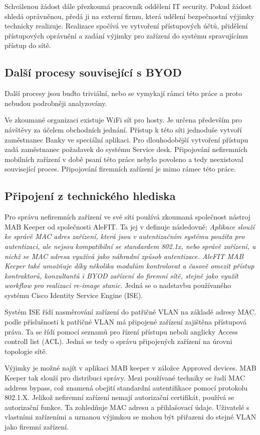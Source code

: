 Schválenou žádost dále přezkoumá pracovník oddělení IT security. Pokud žádost shledá oprávněnou, předá ji na externí firmu, která udělení bezpečnostní výjimky technicky realizuje. Realizace spočívá ve vytvoření přístupových účtů, přidělení přístupových oprávnění a zadání výjimky pro zařízení do systému spravujícímu přístup do sítě. 

\subsection{Další procesy související s BYOD}
Další procesy jsou buďto triviální, nebo se vymykají rámci této práce a proto nebudou podrobněji analyzovány.

Ve zkoumané organizaci existuje WiFi síť pro hosty.  Je určena především pro návštěvy za účelem obchodních jednání. Přístup k této síti jednoduše vytvoří zaměstnanec Banky ve speciální aplikaci. Pro dlouhodobější vytvoření přístupu zadá zaměstnanec požadavek do systému Service desk.
Připojování nefiremních mobilních zařízení v době psaní této práce nebylo povoleno a tedy neexistoval související proces. Připojování firemních zařízení je mimo rámec této práce. 

\subsection{Připojení z technického hlediska}

Pro správu nefiremních zařízení ve své síti používá zkoumaná společnost nástroj MAB Keeper od společnosti AleFIT. Ta jej v \cite{MABKeeper} definuje následovně: \textit{Aplikace slouží ke správě MAC adres zařízení, která jsou v autentizačním systému použita pro autentizaci, ale nejsou kompatibilní se standardem 802.1x, nebo správě zařízení, u nichž se MAC adresa využívá jako náhradní způsob autentizace. AleFIT MAB Keeper také umožňuje díky několika modulům kontrolovat a časově omezit přístup kontraktorů, konzultantů i BYOD zařízení do firemní sítě, stejně jako využít workflow pro realizaci re-image stanic.} Jedná se o nadstavbu používaného systému Cisco Identity Service Engine (ISE).


Systém ISE řídí nasměrování zařízení do patřičné VLAN na základě adresy MAC. podle příslušnosti k patřičné VLAN má připojené zařízení zajištěna přístupová práva. Ta se řídí pomocí seznamů pro řízení přístupu neboli anglicky Access controll list (ACL). Jedná se tedy o správu připojených zařízení na úrovni topologie sítě. 

Výjimky je možné najít v aplikaci MAB keeper v záložce Approved devices. MAB Keeper tak slouží pro distribuci správy. Mezi používané techniky se řadí MAC address bypass, což znamená obejití standardní autentifikace pomocí protokolu 802.1.X. Jelikož nefiremní zařízení nemají autorizační certifikát, používá se autorizační funkce. Ta zohledňuje MAC adresu a přihlašovací údaje. Uživatelé s vlastními zařízeními a uznanou výjimkou se mohou být přiřazeni do stejné VLAN jako firemní zařízení.


